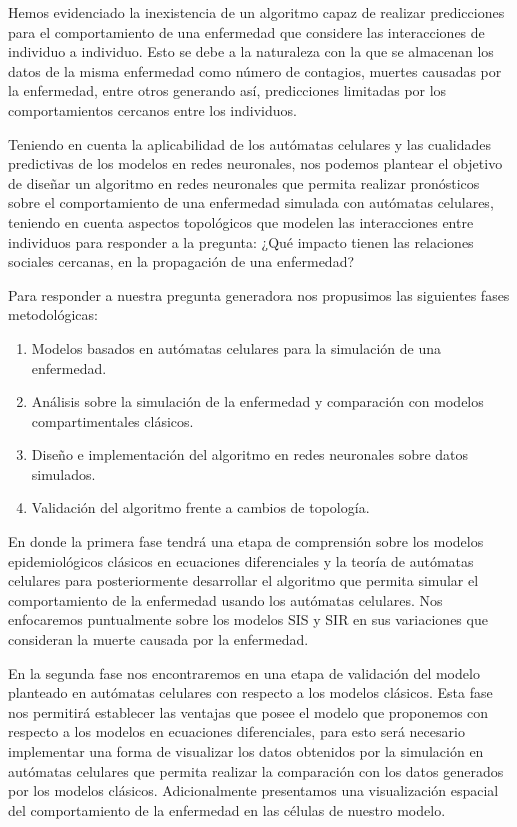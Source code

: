 Hemos evidenciado la inexistencia de un algoritmo capaz de realizar predicciones para el comportamiento de una enfermedad que considere las interacciones de individuo a individuo. Esto se debe a la naturaleza con la que se almacenan los datos de la misma enfermedad como número de contagios, muertes causadas por la enfermedad, entre otros generando así, predicciones limitadas por los comportamientos cercanos entre los individuos. 

Teniendo en cuenta la aplicabilidad de los autómatas celulares y las cualidades predictivas de los modelos en redes neuronales, nos podemos plantear el objetivo de diseñar un algoritmo en redes neuronales que permita realizar pronósticos sobre el comportamiento de una enfermedad simulada con autómatas celulares, teniendo en cuenta aspectos topológicos que modelen las interacciones entre individuos para responder a la pregunta: ¿Qué impacto tienen las relaciones sociales cercanas, en la propagación de una enfermedad?

Para responder a nuestra pregunta generadora nos propusimos las siguientes fases metodológicas:
\begin{enumerate}
    \item Modelos basados en autómatas celulares para la simulación de una enfermedad.
    \item Análisis sobre la simulación de la enfermedad y comparación con modelos compartimentales clásicos.
    \item Diseño e implementación del algoritmo en redes neuronales sobre datos simulados.
    \item Validación del algoritmo frente a cambios de topología.
\end{enumerate}

En donde la primera fase tendrá una etapa de comprensión sobre los modelos epidemiológicos clásicos en ecuaciones diferenciales y la teoría de autómatas celulares para posteriormente desarrollar el algoritmo que permita simular el comportamiento de la enfermedad usando los autómatas celulares. Nos enfocaremos puntualmente sobre los modelos SIS y SIR en sus variaciones que consideran la muerte causada por la enfermedad.

En la segunda fase nos encontraremos en una etapa de validación del modelo planteado en autómatas celulares con respecto a los modelos clásicos. Esta fase nos permitirá establecer las ventajas que posee el modelo que proponemos con respecto a los modelos en ecuaciones diferenciales, para esto será necesario implementar una forma de visualizar los datos obtenidos por la simulación en autómatas celulares que permita realizar la comparación con los datos generados por los modelos clásicos. Adicionalmente presentamos una visualización espacial del comportamiento de la enfermedad en las células de nuestro modelo.

